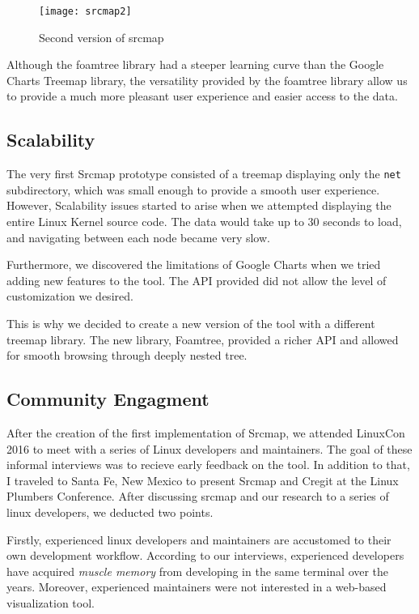 \begin{figure}[htb]
\centering
\texttt{[image: srcmap2]}
\caption{Second version of srcmap}
\label{fig:srcmap2}
\end{figure}

Although the foamtree library had a steeper learning curve than the Google Charts Treemap library, the versatility provided by the foamtree library allow us to provide a much more pleasant user experience and easier access to the data.




\subsection{Scalability}

The very first Srcmap prototype consisted of a treemap displaying only the \texttt{net} subdirectory, which was small enough to provide a smooth user experience. However, Scalability issues started to arise when we attempted displaying the entire Linux Kernel source code. The data would take up to 30 seconds to load, and navigating between each node became very slow.


Furthermore, we discovered the limitations of Google Charts when we tried adding new features to the tool. The API provided did not allow the level of customization we desired. 


This is why we decided to create a new version of the tool with a different treemap library. The new library, Foamtree, provided a richer API and allowed for smooth browsing through deeply nested tree.





\subsection{Community Engagment}

After the creation of the first implementation of Srcmap, we attended LinuxCon 2016 to meet with a series of Linux developers and maintainers. The goal of these informal interviews was to recieve early feedback on the tool. In addition to that, I traveled to Santa Fe, New Mexico to present Srcmap and Cregit at the Linux Plumbers Conference. After discussing srcmap and our research to a series of linux developers, we deducted two points. 

Firstly, experienced linux developers and maintainers are accustomed to their own development workflow. According to our interviews, experienced developers have acquired \textit{muscle memory} from developing in the same terminal over the years. Moreover, experienced maintainers were not interested in a web-based visualization tool.

